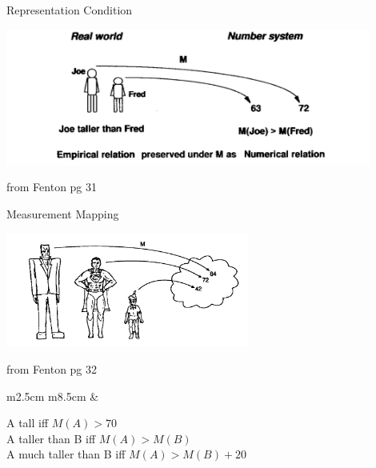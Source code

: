 \documentclass{beamer}
\begin{document}
\begin{frame}{\centerline{Representation Condition}}

\begin{center}
\includegraphics[width=120mm]{A2022.IDSEPC.SperimentazioneDeduzione/img-img10.png}
\newline
\end{center}

\begin{small}
\begin{center}
from Fenton pg 31
\end{center}
\end{small}

\end{frame}

\begin{frame}{\centerline{Measurement Mapping}}

\begin{center}
\includegraphics[width=80mm]{A2022.IDSEPC.SperimentazioneDeduzione/img-img11.png}
\begin{small}
from Fenton pg 32
\end{small}
\end{center}
\begin{table}[H]
\begin{tabulary}{\textwidth}{m{2.5cm} m{8.5cm}}
&\begin{tcolorbox}
A tall iff \(M(A) > 70\)\\
A taller than B iff \(M(A) > M(B)\)\\
A much taller than B iff \(M(A) > M(B) + 20\)
\end{tcolorbox}
\end{tabulary}
\end{table}

\end{frame}
\end{document}
